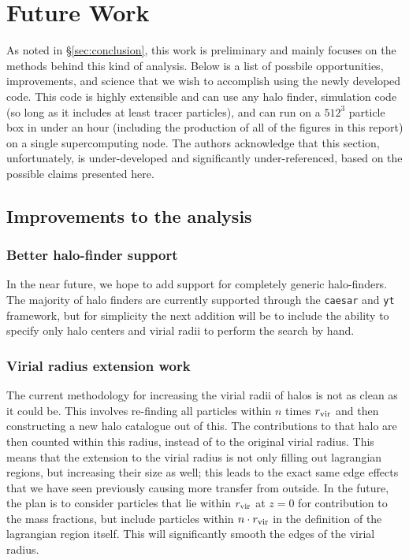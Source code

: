 \section{Future Work}
\label{sec:futurework}

As noted in \S \ref{sec:conclusion}, this work is preliminary and mainly
focuses on the methods behind this kind of analysis. Below is a list of
possbile opportunities, improvements, and science that we wish to accomplish
using the newly developed \ltcaesar{} code. This code is highly extensible and
can use any halo finder, simulation code (so long as it includes at least
tracer particles), and can run on a $512^3$ particle box in under an hour
(including the production of all of the figures in this report) on a single
supercomputing node. The authors acknowledge that this section, unfortunately,
is under-developed and significantly under-referenced, based on the possible
claims presented here.

\subsection{Improvements to the analysis}

\subsubsection{Better halo-finder support}

In the near future, we hope to add support for completely generic halo-finders.
The majority of halo finders are currently supported through the {\tt caesar}
and {\tt yt} framework, but for simplicity the next addition will be to
include the ability to specify only halo centers and virial radii to perform
the search by hand.

\subsubsection{Virial radius extension work}

The current methodology for increasing the virial radii of halos is not as
clean as it could be. This involves re-finding all particles within $n$ times
$r_{\rm vir}$ and then constructing a new halo catalogue out of this. The
contributions to that halo are then counted within this radius, instead of
to the original virial radius. This means that the extension to the virial
radius is not only filling out lagrangian regions, but increasing their
size as well; this leads to the exact same edge effects that we have seen
previously causing more transfer from outside. In the future, the plan is to
consider particles that lie within $r_{\rm vir}$ at $z=0$ for contribution
to the mass fractions, but include particles within $n \cdot r_{\rm vir}$
in the definition of the lagrangian region itself. This will significantly
smooth the edges of the virial radius.

